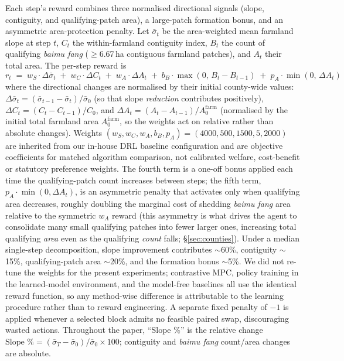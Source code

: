 \documentclass[11pt]{article}
\begin{document}
Each step's reward combines three normalised directional signals (slope, contiguity, and qualifying-patch area), a large-patch formation bonus, and an asymmetric area-protection penalty. Let $\bar{\sigma}_t$ be the area-weighted mean farmland slope at step $t$, $C_t$ the within-farmland contiguity index, $B_t$ the count of qualifying \textit{baimu fang} ($\geq$6.67\,ha contiguous farmland patches), and $A_t$ their total area. The per-step reward is
\begin{equation}
\label{eq:reward}
r_t \;=\; w_S \cdot \Delta \bar{\sigma}_t
       \;+\; w_C \cdot \Delta C_t
       \;+\; w_A \cdot \Delta A_t
       \;+\; b_B \cdot \max(0,\, B_t - B_{t-1})
       \;+\; p_A \cdot \min(0,\, \Delta A_t)
\end{equation}
where the directional changes are normalised by their initial county-wide values: $\Delta \bar{\sigma}_t = (\bar{\sigma}_{t-1} - \bar{\sigma}_t)/\bar{\sigma}_0$ (so that slope \emph{reduction} contributes positively), $\Delta C_t = (C_t - C_{t-1})/C_0$, and $\Delta A_t = (A_t - A_{t-1})/A_0^{\mathrm{farm}}$ (normalised by the initial total farmland area $A_0^{\mathrm{farm}}$, so the weights act on relative rather than absolute changes). Weights $(w_S, w_C, w_A, b_B, p_A) = (4000, 500, 1500, 5, 2000)$ are inherited from our in-house DRL baseline configuration and are objective coefficients for matched algorithm comparison, not calibrated welfare, cost-benefit or statutory preference weights. The fourth term is a one-off bonus applied each time the qualifying-patch count increases between steps; the fifth term, $p_A \cdot \min(0, \Delta A_t)$, is an asymmetric penalty that activates only when qualifying area decreases, roughly doubling the marginal cost of shedding \textit{baimu fang} area relative to the symmetric $w_A$ reward (this asymmetry is what drives the agent to consolidate many small qualifying patches into fewer larger ones, increasing total qualifying \emph{area} even as the qualifying \emph{count} falls; \S\ref{sec:counties}). Under a median single-step decomposition, slope improvement contributes $\sim$60\%, contiguity $\sim$15\%, qualifying-patch area $\sim$20\%, and the formation bonus $\sim$5\%. We did not re-tune the weights for the present experiments; contrastive MPC, policy training in the learned-model environment, and the model-free baselines all use the identical reward function, so any method-wise difference is attributable to the learning procedure rather than to reward engineering. A separate fixed penalty of $-1$ is applied whenever a selected block admits no feasible paired swap, discouraging wasted actions. Throughout the paper, ``Slope \%'' is the relative change $\text{Slope \%} = (\bar{\sigma}_T - \bar{\sigma}_0)/\bar{\sigma}_0 \times 100$; contiguity and \textit{baimu fang} count/area changes are absolute.
\end{document}
